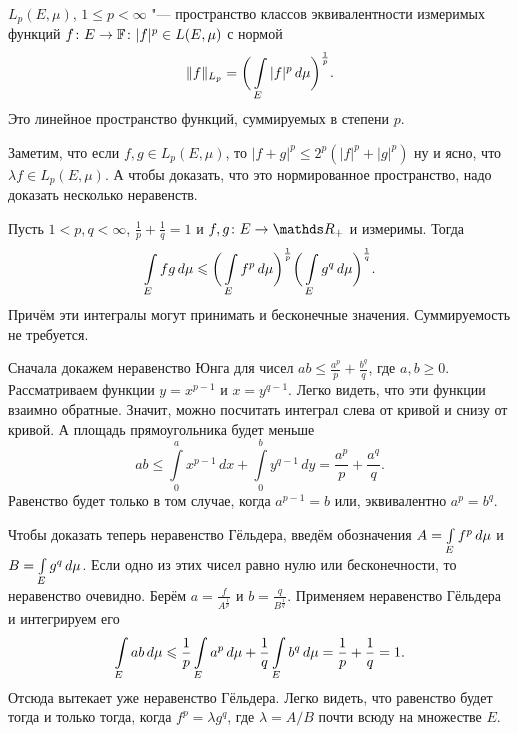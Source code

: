 \begin{Def}
  $L_p(E,\mu)$, $1\le p<\infty$ "--- пространство классов эквивалентности измеримых функций $f\colon E\rightarrow \mathbb F\colon |f|^p\in L(E,\mu)$ с нормой 
\[
  \|f\|_{L_p} = \bigg(\int\limits_{E}|f|^p\,d\mu\bigg)^{\frac1p}.
\]
Это линейное пространство функций, суммируемых в степени $p$.
\end{Def}

Заметим, что если $f,g\in L_p(E,\mu)$, то $|f+g|^p\le 2^p (|f|^p+|g|^p)$ ну и ясно, что $\lambda f\in L_p(E,\mu)$. А чтобы доказать, что это нормированное пространство, надо доказать несколько неравенств.
\begin{Ut}
  Пусть $1<p,q<\infty$, $\frac1p+\frac1q=1$ и $f,g\colon E\to\R_+$ и измеримы. Тогда
\[
  \int\limits_{E}fg\,d\mu\leqslant \bigg(\int\limits_{E}f^p\,d\mu\bigg)^{\frac1p}\bigg(\int\limits_{E}g^q\,d\mu\bigg)^{\frac1q}.
\]
Причём эти интегралы могут принимать и бесконечные значения. Суммируемость не требуется.
\end{Ut}
\begin{Proof}
  Сначала докажем неравенство Юнга для чисел $ab\le \frac{a^p}p + \frac{b^q}q$, где $a,b\ge0$. Рассматриваем функции $y = x^{p-1}$ и $x = y^{q-1}$. Легко видеть, что эти функции взаимно обратные. Значит, можно посчитать интеграл слева от кривой и снизу от кривой. А площадь прямоугольника будет меньше
\[
  ab\le \int\limits_0^a x^{p-1}\,dx + \int\limits_0^b y^{q-1}\,dy = \frac{a^p}p+\frac{a^q}q.
\]
Равенство будет только в том случае, когда $a^{p-1} = b$ или, эквивалентно $a^p = b^q$.

Чтобы доказать теперь неравенство Гёльдера, введём обозначения $A = \int\limits_{E}f^p\,d\mu$ и $B=\int\limits_{E}g^q\,d\mu$. Если одно из этих чисел равно нулю или бесконечности, то неравенство очевидно. Берём $a = \frac f{A^{\frac1p}}$ и $b = \frac q{B^{\frac1q}}$. Применяем неравенство Гёльдера и интегрируем его
\[
  \int\limits_{E}ab\,d\mu\leqslant \frac1p\int\limits_{E}a^p\,d\mu+\frac1q\int\limits_{E}b^q\,d\mu = \frac1p+\frac1q=1.
\]
Отсюда вытекает уже неравенство Гёльдера. Легко видеть, что равенство будет тогда и только тогда, когда $f^p = \lambda g^q$, где $\lambda = A/B$ почти всюду на множестве $E$.
\end{Proof}

